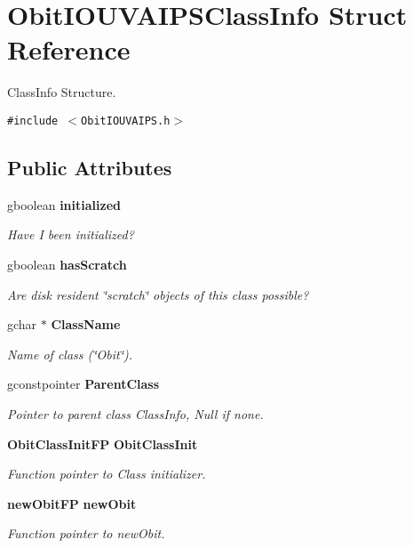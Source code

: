 \section{Obit\-IOUVAIPSClass\-Info Struct Reference}
\label{structObitIOUVAIPSClassInfo}
Class\-Info Structure.  


{\tt \#include $<$Obit\-IOUVAIPS.h$>$}

\subsection*{Public Attributes}
\begin{CompactItemize}
\item 
gboolean {\bf initialized}
\begin{CompactList}\small\item\em Have I been initialized? \item\end{CompactList}\item 
gboolean {\bf has\-Scratch}
\begin{CompactList}\small\item\em Are disk resident \char`\"{}scratch\char`\"{} objects of this class possible? \item\end{CompactList}\item 
gchar $\ast$ {\bf Class\-Name}
\begin{CompactList}\small\item\em Name of class (\char`\"{}Obit\char`\"{}). \item\end{CompactList}\item 
gconstpointer {\bf Parent\-Class}
\begin{CompactList}\small\item\em Pointer to parent class Class\-Info, Null if none. \item\end{CompactList}\item 
{\bf Obit\-Class\-Init\-FP} {\bf Obit\-Class\-Init}
\begin{CompactList}\small\item\em Function pointer to Class initializer. \item\end{CompactList}\item 
{\bf new\-Obit\-FP} {\bf new\-Obit}
\begin{CompactList}\small\item\em Function pointer to new\-Obit. \item\end{CompactList}\item 

\end{CompactItemize}
